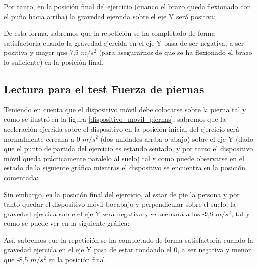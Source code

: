 
Por tanto, en la posición final del ejercicio (cuando el brazo queda flexionado con el puño hacia arriba) la gravedad ejercida sobre el eje Y será positiva:


De esta forma, sabremos que la repetición se ha completado de forma satisfactoria cuando la gravedad ejercida en el eje Y pasa de ser negativa, a ser positiva y mayor que 7,5 $m/s^{2}$ (para asegurarnos de que se ha flexionado el brazo lo suficiente) en la posición final.

\subsection{Lectura para el test Fuerza de piernas}

Teniendo en cuenta que el dispositivo móvil debe colocarse sobre la pierna tal y como se ilustró en la figura \ref{dispositivo_movil_piernas}, sabremos que la aceleración ejercida sobre el dispositivo en la posición inicial del ejercicio será normalmente cercana a 0 $m/s^{2}$ (dos unidades arriba o abajo) sobre el eje Y (dado que el punto de partida del ejercicio es estando sentado, y por tanto el dispositivo móvil queda prácticamente paralelo al suelo) tal y como puede observarse en el estado de la siguiente gráfica mientras el dispositivo se encuentra en la posición comentada:


Sin embargo, en la posición final del ejercicio, al estar de pie la persona y por tanto quedar el dispositivo móvil bocabajo y perpendicular sobre el suelo, la gravedad ejercida sobre el eje Y será negativa y se acercará a los -9,8 $m/s^{2}$, tal y como se puede ver en la siguiente gráfica:


Así, sabremos que la repetición se ha completado de forma satisfactoria cuando la gravedad ejercida en el eje Y pasa de estar rondando el 0, a ser negativa y menor que -8,5 $m/s^{2}$ en la posición final.

